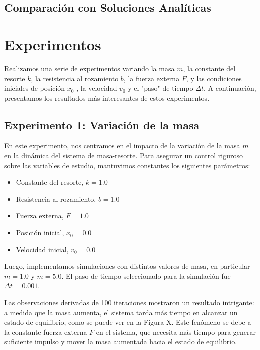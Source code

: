 \documentclass{article}
\begin{document}
\subsection{Comparación con Soluciones Analíticas}


\section{Experimentos}
Realizamos una serie de experimentos variando la masa $m$, la constante del resorte $k$, la resistencia al rozamiento $b$, la fuerza externa $F$, y las condiciones iniciales de posición $x_0$ , la velocidad $v_0$ y el "paso" de tiempo $\Delta t$. A continuación, presentamos los resultados más interesantes de estos experimentos.

\subsection{Experimento 1: Variación de la masa}
En este experimento, nos centramos en el impacto de la variación de la masa $m$ en la dinámica del sistema de masa-resorte. Para asegurar un control riguroso sobre las variables de estudio, mantuvimos constantes los siguientes parámetros:

\begin{itemize}
\item Constante del resorte, $k = 1.0$
\item Resistencia al rozamiento, $b = 1.0$
\item Fuerza externa, $F = 1.0$
\item Posición inicial, $x_0 = 0.0$
\item Velocidad inicial, $v_0 = 0.0$
\end{itemize}

Luego, implementamos simulaciones con distintos valores de masa, en particular $m = 1.0$ y $m = 5.0$. El paso de tiempo seleccionado para la simulación fue $\Delta t= 0.001$.

Las observaciones derivadas de 100 iteraciones mostraron un resultado intrigante: a medida que la masa aumenta, el sistema tarda más tiempo en alcanzar un estado de equilibrio, como se puede ver en la Figura X. Este fenómeno se debe a la constante fuerza externa $F$ en el sistema, que necesita más tiempo para generar suficiente impulso y mover la masa aumentada hacia el estado de equilibrio.
\end{document}
